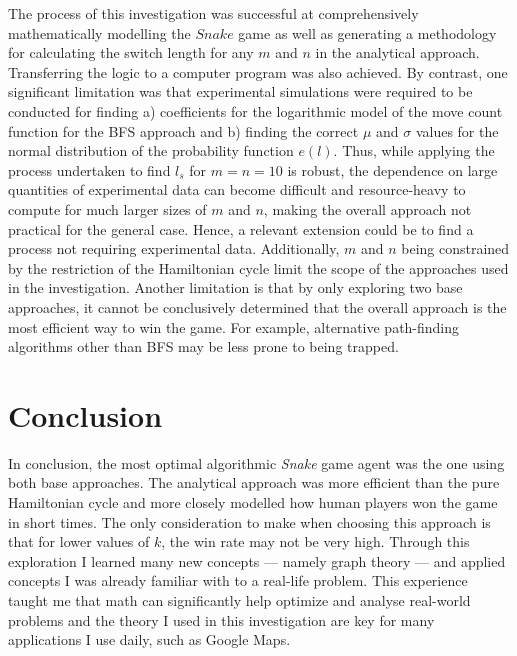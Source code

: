 \documentclass[12pt]{article}
\begin{document}
The process of this investigation was successful at comprehensively mathematically modelling the $Snake$ game as well as generating a methodology for calculating the switch length for any $m$ and $n$ in the analytical approach. Transferring the logic to a computer program was also achieved. By contrast, one significant limitation was that experimental simulations were required to be conducted for finding a) coefficients for the logarithmic model of the move count function for the BFS approach and b) finding the correct $\mu$ and $\sigma$ values for the normal distribution of the probability function $e(l)$. Thus, while applying the process undertaken to find $l_s$ for $m=n=10$ is robust, the dependence on large quantities of experimental data can become difficult and resource-heavy to compute for much larger sizes of $m$ and $n$, making the overall approach not practical for the general case. Hence, a relevant extension could be to find a process not requiring experimental data. Additionally, $m$ and $n$ being constrained by the restriction of the Hamiltonian cycle limit the scope of the approaches used in the investigation. Another limitation is that by only exploring two base approaches, it cannot be conclusively determined that the overall approach is the most efficient way to win the game. For example, alternative path-finding algorithms other than BFS may be less prone to being trapped.

\section{Conclusion}

In conclusion, the most optimal algorithmic \textit{Snake} game agent was the one using both base approaches. The analytical approach was more efficient than the pure Hamiltonian cycle and more closely modelled how human players won the game in short times. The only consideration to make when choosing this approach is that for lower values of $k$, the win rate may not be very high. Through this exploration I learned many new concepts — namely graph theory — and applied concepts I was already familiar with to a real-life problem. This experience taught me that math can significantly help optimize and analyse real-world problems and the theory I used in this investigation are key for many applications I use daily, such as Google Maps.
\end{document}
